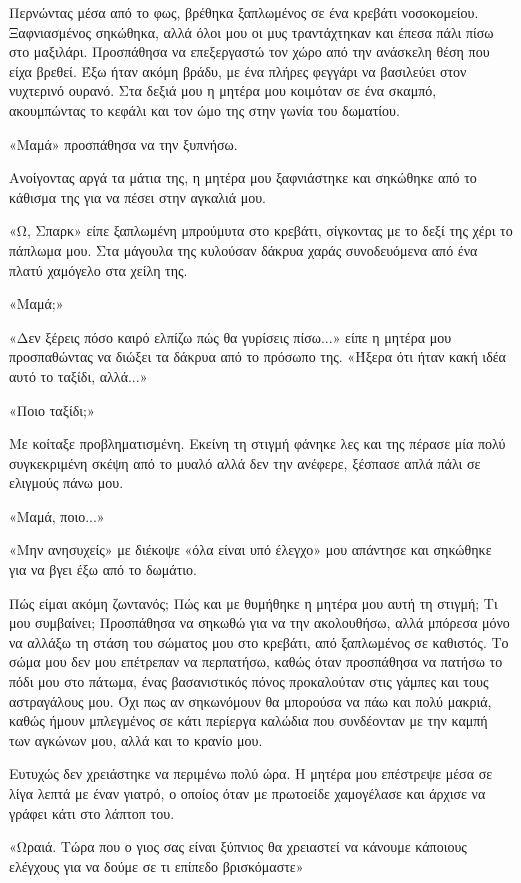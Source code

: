 \documentclass[12pt,twoside, openany]{book}
\begin{document}
Περνώντας μέσα από το φως, βρέθηκα ξαπλωμένος σε ένα κρεβάτι νοσοκομείου. Ξαφνιασμένος σηκώθηκα, αλλά όλοι μου οι μυς τραντάχτηκαν και έπεσα πάλι πίσω στο μαξιλάρι. Προσπάθησα να επεξεργαστώ τον χώρο από την ανάσκελη θέση που είχα βρεθεί. Έξω ήταν ακόμη βράδυ, με ένα πλήρες φεγγάρι να βασιλεύει στον νυχτερινό ουρανό. Στα δεξιά μου η μητέρα μου κοιμόταν σε ένα σκαμπό, ακουμπώντας το κεφάλι και τον ώμο της στην γωνία του δωματίου.

«Μαμά» προσπάθησα να την ξυπνήσω.

Ανοίγοντας αργά τα μάτια της, η μητέρα μου ξαφνιάστηκε και σηκώθηκε από το κάθισμα της για να πέσει στην αγκαλιά μου.

«Ω, Σπαρκ» είπε ξαπλωμένη μπρούμυτα στο κρεβάτι, σίγκοντας με το δεξί της χέρι το πάπλωμα μου. Στα μάγουλα της κυλούσαν δάκρυα χαράς συνοδευόμενα από ένα πλατύ χαμόγελο στα χείλη της.

«Μαμά;»

«Δεν ξέρεις πόσο καιρό ελπίζω πώς θα γυρίσεις πίσω...» είπε η μητέρα μου προσπαθώντας να διώξει τα δάκρυα από το πρόσωπο της. «Ήξερα ότι ήταν κακή ιδέα αυτό το ταξίδι, αλλά...»

«Ποιο ταξίδι;»

Με κοίταξε προβληματισμένη. Εκείνη τη στιγμή φάνηκε λες και της πέρασε μία πολύ συγκεκριμένη σκέψη από το μυαλό αλλά δεν την ανέφερε, ξέσπασε απλά πάλι σε ελιγμούς πάνω μου.

«Μαμά, ποιο...»

«Μην ανησυχείς» με διέκοψε «όλα είναι υπό έλεγχο» μου απάντησε και σηκώθηκε για να βγει έξω από το δωμάτιο. 

Πώς είμαι ακόμη ζωντανός; Πώς και με θυμήθηκε η μητέρα μου αυτή τη στιγμή; Τι μου συμβαίνει; Προσπάθησα να σηκωθώ για να την ακολουθήσω, αλλά μπόρεσα μόνο να αλλάξω τη στάση του σώματος μου στο κρεβάτι, από ξαπλωμένος σε καθιστός. Το σώμα μου δεν μου επέτρεπαν να περπατήσω, καθώς όταν προσπάθησα να πατήσω το πόδι μου στο πάτωμα, ένας βασανιστικός πόνος προκαλούταν στις γάμπες και τους αστραγάλους μου. Όχι πως αν σηκωνόμουν θα μπορούσα να πάω και πολύ μακριά, καθώς ήμουν μπλεγμένος σε κάτι περίεργα καλώδια που συνδέονταν με την καμπή των αγκώνων μου, αλλά και το κρανίο μου. 

Ευτυχώς δεν χρειάστηκε να περιμένω πολύ ώρα. Η μητέρα μου επέστρεψε μέσα σε λίγα λεπτά με έναν γιατρό, ο οποίος όταν με πρωτοείδε χαμογέλασε και άρχισε να γράφει κάτι στο λάπτοπ του.

«Ωραιά. Τώρα που ο γιος σας είναι ξύπνιος θα χρειαστεί να κάνουμε κάποιους ελέγχους για να δούμε σε τι επίπεδο βρισκόμαστε»
\end{document}
